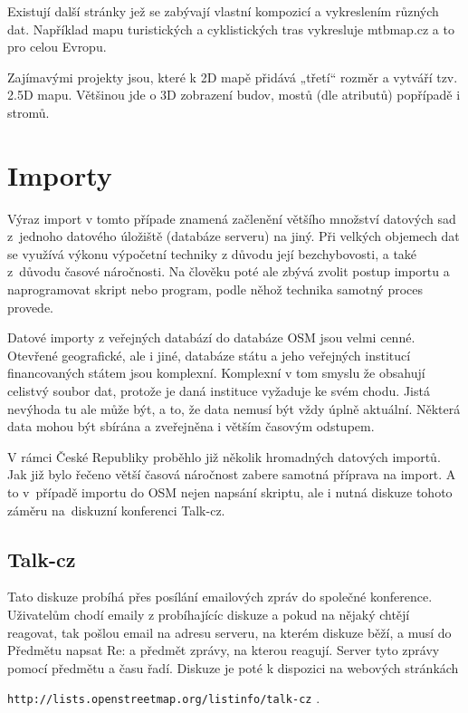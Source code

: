 Existují další stránky jež se zabývají vlastní kompozicí a vykreslením
různých dat. Například mapu turistických a cyklistických tras vykresluje
 mtbmap.cz a to pro celou Evropu. 
 
Zajímavými projekty jsou, které k 2D mapě přidává „třetí“ rozměr a 
vytváří tzv. 2.5D mapu. Většinou jde o 3D zobrazení budov, mostů (dle 
atributů) popřípadě i stromů. 



\section{Importy}
\label{Importy}
Výraz import v tomto případe znamená začlenění většího množství datových sad 
z~jednoho datového úložiště (databáze serveru) na jiný. Při velkých objemech dat
se využívá výkonu výpočetní techniky z důvodu její bezchybovosti, a také 
z~důvodu časové náročnosti. Na člověku poté ale zbývá zvolit postup importu
a naprogramovat skript nebo program, podle něhož technika samotný proces 
provede. 

Datové importy z veřejných databází do databáze OSM jsou velmi cenné. 
Otevřené geografické, ale i jiné, databáze státu a jeho veřejných institucí 
financovaných státem jsou komplexní. Komplexní v tom smyslu že obsahují celistvý
soubor dat, protože je daná instituce vyžaduje ke svém chodu. Jistá nevýhoda tu 
ale může být, a to, že data nemusí být vždy úplně aktuální. Některá data mohou 
být sbírána a zveřejněna i větším časovým odstupem.

V rámci České Republiky proběhlo již několik hromadných datových importů. Jak 
již bylo řečeno větší časová náročnost zabere samotná příprava na import. A to 
v~případě importu do OSM nejen napsání skriptu, ale i nutná diskuze tohoto záměru
na~diskuzní konferenci Talk-cz. 

\subsection{Talk-cz}
\label{Talk-cz}
Tato diskuze probíhá přes posílání emailových zpráv do společné konference. 
Uživatelům chodí emaily z probíhajícíc diskuze a pokud na nějaký chtějí reagovat,
tak pošlou email na adresu serveru, na kterém diskuze běží, a musí do Předmětu 
napsat Re: a předmět zprávy, na kterou reagují. Server tyto zprávy pomocí 
předmětu a času řadí. Diskuze je poté k dispozici na webových stránkách 

{\tt http://lists.openstreetmap.org/listinfo/talk-cz} .


